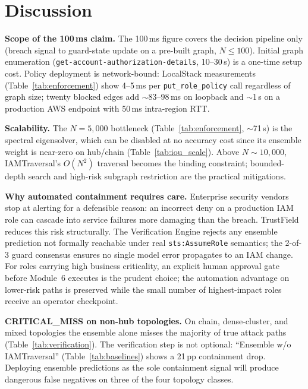 \documentclass[conference,a4paper]{IEEEtran}
\begin{document}
\section{Discussion}
\label{sec:discussion}

\textbf{Scope of the 100\,ms claim.}
The 100\,ms figure covers the decision pipeline only (breach signal to
guard-state update on a pre-built graph, $N{\le}100$). Initial graph
enumeration (\texttt{get-account-authorization-details}, 10--30\,s) is
a one-time setup cost. Policy deployment is network-bound: LocalStack
measurements (Table~\ref{tab:enforcement}) show 4--5\,ms per
\texttt{put\_role\_policy} call regardless of graph size; twenty
blocked edges add $\sim$83--98\,ms on loopback and $\sim$1\,s on a
production AWS endpoint with 50\,ms intra-region RTT.

\textbf{Scalability.}
The $N{=}5{,}000$ bottleneck (Table~\ref{tab:enforcement}, $\sim$71\,s)
is the spectral eigensolver, which can be disabled at no accuracy cost
since its ensemble weight is near-zero on hub/chain (Table~\ref{tab:iou_scale}).
Above $N{\sim}10{,}000$, IAMTraversal's $O(N^2)$ traversal becomes the
binding constraint; bounded-depth search and high-risk subgraph restriction
are the practical mitigations.

\textbf{Why automated containment requires care.}
Enterprise security vendors stop at alerting for a defensible reason: an
incorrect deny on a production IAM role can cascade into service failures
more damaging than the breach. TrustField reduces this risk structurally.
The Verification Engine rejects any ensemble prediction not formally
reachable under real \texttt{sts:AssumeRole} semantics; the 2-of-3 guard
consensus ensures no single model error propagates to an IAM change.
For roles carrying high business criticality, an explicit human approval
gate before Module~6 executes is the prudent choice; the automation
advantage on lower-risk paths is preserved while the small number of
highest-impact roles receive an operator checkpoint.

\textbf{CRITICAL\_MISS on non-hub topologies.}
On chain, dense-cluster, and mixed topologies the ensemble alone misses
the majority of true attack paths (Table~\ref{tab:verification}).
The verification step is not optional: ``Ensemble w/o IAMTraversal''
(Table~\ref{tab:baselines}) shows a 21\,pp containment drop.
Deploying ensemble predictions as the sole containment signal will
produce dangerous false negatives on three of the four topology classes.
\end{document}
